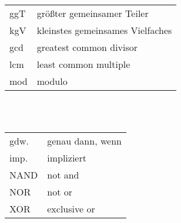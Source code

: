 \\[2pt]
\begin{tabular}{ll}
ggT & größter gemeinsamer Teiler\\
kgV & kleinstes gemeinsames Vielfaches\\
gcd & greatest common divisor\\
lcm & least common multiple\\
mod & modulo
\end{tabular}\\[4pt]
\\[2pt]
\begin{tabular}{ll}
gdw. & genau dann, wenn\\
imp. & impliziert\\
NAND & not and\\
NOR & not or\\
XOR & exclusive or
\end{tabular}

